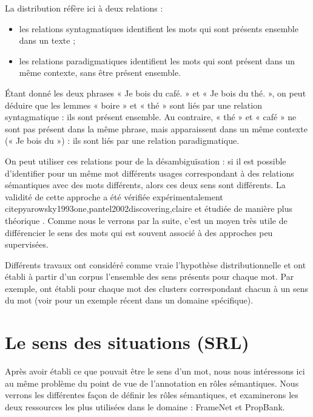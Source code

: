 La distribution réfère ici à deux relations \citep{sahlgren2008distributional}
:

\begin{itemize}

    \item les relations syntagmatiques identifient les mots qui sont présents
        ensemble dans un texte ;

    \item les relations paradigmatiques identifient les mots qui sont présent
        dans un même contexte, sans être présent ensemble.

\end{itemize}

Étant donné les deux phrases « Je bois du café. » et « Je bois du thé. », on
peut déduire que les lemmes « boire » et « thé » sont liés par une relation
syntagmatique : ils sont présent ensemble. Au contraire, « thé » et « café » ne
sont pas présent dans la même phrase, mais apparaissent dans un même contexte
(« Je bois du ») : ils sont liés par une relation paradigmatique.

On peut utiliser ces relations pour de la désambiguïsation : si il est possible
d'identifier pour un même mot différents usages correspondant à des relations
sémantiques avec des mots différents, alors ces deux sens sont différents. La
validité de cette approche a été vérifiée expérimentalement
citep{yarowsky1993one,pantel2002discovering,claire} et étudiée de manière plus
théorique \citep{sahlgren2006word,sahlgren2008distributional}. Comme nous le
verrons par la suite, c'est un moyen très utile de différencier le sens des
mots qui est souvent associé à des approches peu supervisées.

Différents travaux ont considéré comme vraie l'hypothèse distributionnelle et
ont établi à partir d'un corpus l'ensemble des sens présents pour chaque mot.
Par exemple,
\cite{schutze1998automatic,pantel2002discovering,niu2007three,pedersen2010duluth}
ont établi pour chaque mot des clusters correspondant chacun à un sens du mot
(voir \cite{liu2012semantic} pour un exemple récent dans un domaine
spécifique).

\section{Le sens des situations (SRL)}
\label{senssituation}

Après avoir établi ce que pouvait être le sens d'un mot, nous nous intéressons
ici au même problème du point de vue de l'annotation en rôles sémantiques. Nous
verrons les différentes façon de définir les rôles sémantiques, et examinerons
les deux ressources les plus utilisées dans le domaine : FrameNet et PropBank.

